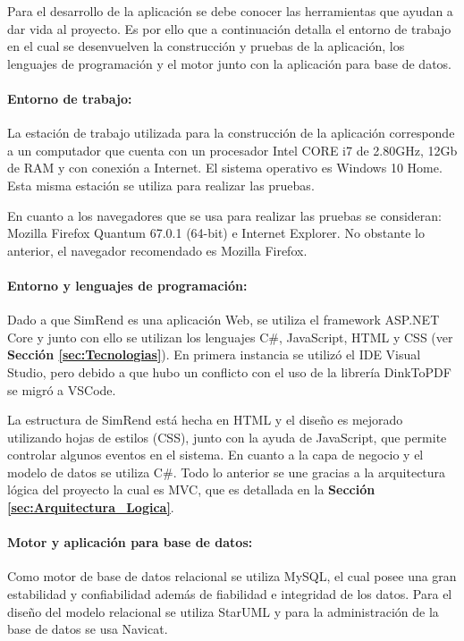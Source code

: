 Para el desarrollo de la aplicación se debe conocer las herramientas que ayudan a dar vida al proyecto. Es por ello que a continuación detalla el entorno de trabajo en el cual se desenvuelven la construcción y pruebas de la aplicación, los lenguajes de programación y el motor junto con la aplicación para base de datos.

\paragraph{Entorno de trabajo: } La estación de trabajo utilizada para la construcción de la aplicación corresponde a un computador que cuenta con un procesador Intel CORE i7 de 2.80GHz, 12Gb de RAM y con conexión a Internet. El sistema operativo es Windows 10 Home. Esta misma estación se utiliza para realizar las pruebas.

En cuanto a los navegadores que se usa para realizar las pruebas se consideran: Mozilla Firefox Quantum 67.0.1 (64-bit) e Internet Explorer. No obstante lo anterior, el navegador recomendado es Mozilla Firefox.

\paragraph{Entorno y lenguajes de programación: } Dado a que SimRend es una aplicación Web, se utiliza el framework ASP.NET Core y junto con ello se utilizan los lenguajes C\#, JavaScript, HTML y CSS (ver \textbf{Sección \ref{sec:Tecnologias}}). En primera instancia se utilizó el IDE Visual Studio, pero debido a que hubo un conflicto con el uso de la librería DinkToPDF se migró a VSCode. 

La estructura de SimRend está hecha en HTML y el diseño es mejorado utilizando hojas de estilos (CSS), junto con la ayuda de JavaScript, que permite controlar algunos eventos en el sistema. En cuanto a la capa de negocio y el modelo de datos se utiliza C\#. Todo lo anterior se une gracias a la arquitectura lógica del proyecto la cual es MVC, que es detallada en la \textbf{Sección \ref{sec:Arquitectura_Logica}}.

\paragraph{Motor y aplicación para base de datos: } Como motor de base de datos relacional se utiliza MySQL, el cual posee una gran estabilidad y confiabilidad además de fiabilidad e integridad de los datos. Para el diseño del modelo relacional se utiliza StarUML y para la administración de la base de datos se usa Navicat.

